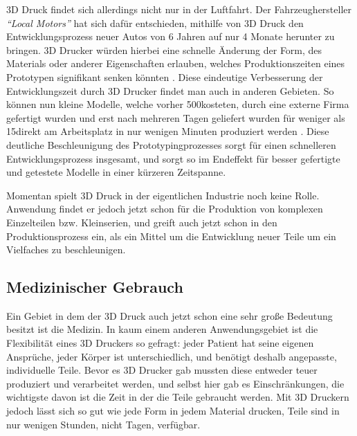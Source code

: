 3D Druck findet sich allerdings nicht nur in der Luftfahrt. Der Fahrzeughersteller \emph{\textquotedblleft Local Motors\textquotedblright} hat sich dafür entschieden, mithilfe von 3D Druck den Entwicklungsprozess neuer Autos von 6 Jahren auf nur 4 Monate herunter zu bringen. 3D Drucker würden hierbei eine schnelle Änderung der Form, des Materials oder anderer Eigenschaften erlauben, welches Produktionszeiten eines Prototypen signifikant senken könnten \parencite{Local_Motor}. 
Diese eindeutige Verbesserung der Entwicklungszeit durch 3D Drucker findet man auch in anderen Gebieten. So können nun kleine Modelle, welche vorher 500\EURO kosteten, durch eine externe Firma gefertigt wurden und erst nach mehreren Tagen geliefert wurden für weniger als 15\EURO direkt am Arbeitsplatz in nur wenigen Minuten produziert werden \parencite{BALDOR_CASE}.
Diese deutliche Beschleunigung des Prototypingprozesses sorgt für einen schnelleren Entwicklungsprozess insgesamt, und sorgt so im Endeffekt für besser gefertigte und getestete Modelle in einer kürzeren Zeitspanne.

Momentan spielt 3D Druck in der eigentlichen Industrie noch keine Rolle. Anwendung findet er jedoch jetzt schon für die Produktion von komplexen Einzelteilen bzw. Kleinserien, und greift auch jetzt schon in den Produktionsprozess ein, als ein Mittel um die Entwicklung neuer Teile um ein Vielfaches zu beschleunigen.

\subsection{Medizinischer Gebrauch}

Ein Gebiet in dem der 3D Druck auch jetzt schon eine sehr große Bedeutung besitzt ist die Medizin. In kaum einem anderen Anwendungsgebiet ist die Flexibilität eines 3D Druckers so gefragt: jeder Patient hat seine eigenen Ansprüche, jeder Körper ist unterschiedlich, und benötigt deshalb angepasste, individuelle Teile. Bevor es 3D Drucker gab mussten diese entweder teuer produziert und verarbeitet werden, und selbst hier gab es Einschränkungen, die wichtigste davon ist die Zeit in der die Teile gebraucht werden. Mit 3D Druckern jedoch lässt sich so gut wie jede Form in jedem Material drucken, Teile sind in nur wenigen Stunden, nicht Tagen, verfügbar.

